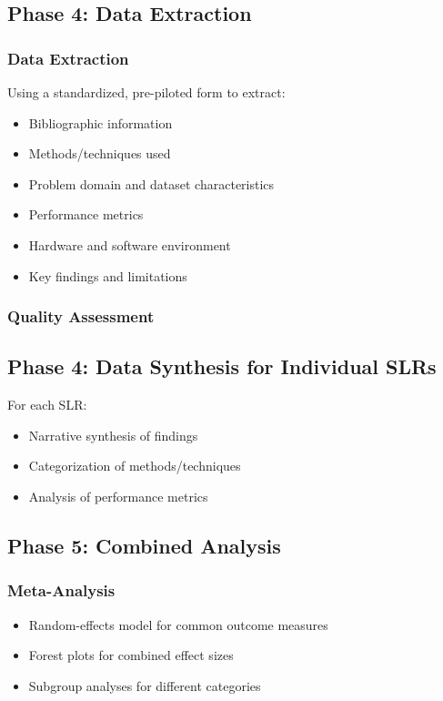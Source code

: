 \documentclass[a4paper,12pt]{article}
\begin{document}
\subsection{Phase 4: Data Extraction}

\subsubsection{Data Extraction}
Using a standardized, pre-piloted form to extract:
\begin{itemize}
    \item Bibliographic information
    \item Methods/techniques used
    \item Problem domain and dataset characteristics
    \item Performance metrics
    \item Hardware and software environment
    \item Key findings and limitations
\end{itemize}

\subsubsection{Quality Assessment}


\subsection{Phase 4: Data Synthesis for Individual SLRs}

For each SLR:
\begin{itemize}
    \item Narrative synthesis of findings
    \item Categorization of methods/techniques
    \item Analysis of performance metrics
\end{itemize}

\subsection{Phase 5: Combined Analysis}

\subsubsection{Meta-Analysis}
\begin{itemize}
    \item Random-effects model for common outcome measures
    \item Forest plots for combined effect sizes
    \item Subgroup analyses for different categories
\end{itemize}
\end{document}
